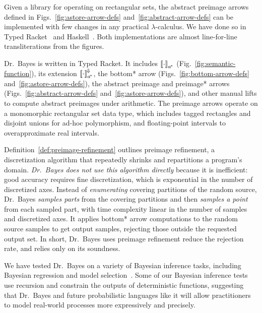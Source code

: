 \documentclass{llncs}
\newcommand{\figref}[1]{Fig.~\ref{#1}}
\newcommand{\figsref}[1]{Figs.~\ref{#1}}
\newcommand{\conv}{^{\mspace{-2mu}\Downarrow\mspace{-2mu}}}
\newcommand{\genc}{_{a^{\mspace{-2mu}*}}}
\begin{document}
Given a library for operating on rectangular sets, the abstract preimage arrows defined in \figsref{fig:astore-arrow-defs} and~\ref{fig:abstract-arrow-defs} can be implemented with few changes in any practical $\lambda$-calculus.
We have done so in Typed Racket~\cite{cit:tobin-hochstadt-2008popl-typed-scheme} and Haskell~\cite{cit:haskell-lang}.
Both implementations are almost line-for-line transliterations from the figures.

Dr.~Bayes is written in Typed Racket.
It includes $\meaningof{\cdot}\genc$ (\figref{fig:semantic-function}), its extension $\meaningof{\cdot}\genc\conv$, the bottom* arrow (\figsref{fig:bottom-arrow-defs} and~\ref{fig:astore-arrow-defs}), the abstract preimage and preimage* arrows (\figsref{fig:abstract-arrow-defs} and~\ref{fig:astore-arrow-defs}), and other manual lifts to compute abstract preimages under arithmetic.
The preimage arrows operate on a monomorphic rectangular set data type, which includes tagged rectangles and disjoint unions for ad-hoc polymorphism, and floating-point intervals to overapproximate real intervals.

Definition~\ref{def:preimage-refinement} outlines preimage refinement, a discretization algorithm that repeatedly shrinks and repartitions a program's domain.
\emph{Dr.~Bayes does not use this algorithm directly} because it is inefficient: good accuracy requires fine discretization, which is exponential in the number of discretized axes.
Instead of \emph{enumerating} covering partitions of the random source, Dr.~Bayes \emph{samples parts} from the covering partitions and then \emph{samples a point} from each sampled part, with time complexity linear in the number of samples and discretized axes.
It applies bottom* arrow computations to the random source samples to get output samples, rejecting those outside the requested output set.
In short, Dr.~Bayes uses preimage refinement reduce the rejection rate, and relies only on its soundness.

We have tested Dr.~Bayes on a variety of Bayesian inference tasks, including Bayesian regression and model selection~\cite{cit:toronto-thesis}.
Some of our Bayesian inference tests use recursion and constrain the outputs of deterministic functions, suggesting that Dr.~Bayes and future probabilistic languages like it will allow practitioners to model real-world processes more expressively and precisely.
\end{document}
